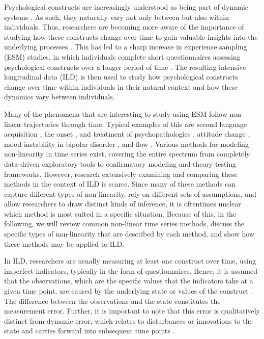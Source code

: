 Psychological constructs are increasingly understood as being part of dynamic 
systems \parencite{nesselroade_studying_2004, wang_investigating_2012, 
gelfand_dynamical_2012}. As such, they naturally vary not only between but also 
within individuals. Thus, researchers are becoming more aware of the importance of 
studying how these constructs change over time to gain valuable insights into the 
underlying processes \parencite{molenaar_manifesto_2004}. This has led to a sharp 
increase in experience sampling (ESM) studies, in which 
individuals complete short questionnaires assessing psychological constructs over 
a longer period of time \parencite{scollon_experience_2003, 
miller_smartphone_2012}. The resulting 
intensive longitudinal data (ILD) is then used to study how psychological 
constructs change over time within individuals in their natural context and how 
these dynamics vary between individuals. 

Many of the phenomena that are interesting to study using ESM follow 
non-linear trajectories through time. Typical examples of this are 
second language acquisition \parencite{hohenberger_language_2009, 
murakami_modeling_2016, reid_bifurcations_2019}, the onset 
\parencite{nelson_moving_2017, van_de_leemput_critical_2014}, and treatment of 
psychopathologies \parencite{hayes_change_2007, hosenfeld_major_2015, 
schiepek_complexity_2009}, attitude change \parencite{van_der_maas_sudden_2003}, 
mood instability in bipolar disorder \parencite{bonsall_nonlinear_2012}, and flow
\parencite{ceja_suddenly_2012, ceja_dynamics_2009}. 
Various methods for modeling non-linearity in time series exist, covering the entire spectrum 
from completely data-driven exploratory tools to confirmatory modeling and 
theory-testing frameworks. However, research extensively examining and comparing 
these methods in the context of ILD is scarce. Since many of these methods can 
capture different types of non-linearity, rely on different sets of assumptions, 
and allow researchers to draw distinct kinds of inference, it is oftentimes 
unclear which method is most suited in a specific situation. Because of this, in 
the following, we will review common non-linear time series methods, discuss the 
specific types of non-linearity that are described by each method, and show how 
these methods may be applied to ILD. 

In ILD, researchers are usually measuring at least one construct over time, using 
imperfect indicators, typically in the form of questionnaires. Hence, it is 
assumed that the observations, which are the specific values that the indicators 
take at a given time point, are caused by the underlying 
state or values of the construct \parencite{mcneish_measurement_2021, 
vogelsmeier_assessing_2023}. The difference between the observations and the 
state constitutes the measurement error. Further, it is important to note that 
this error is qualitatively distinct from dynamic error, which relates to 
disturbances or innovations to the state and carries forward into subsequent time 
points \parencite{schuurman_incorporating_2015}. 

